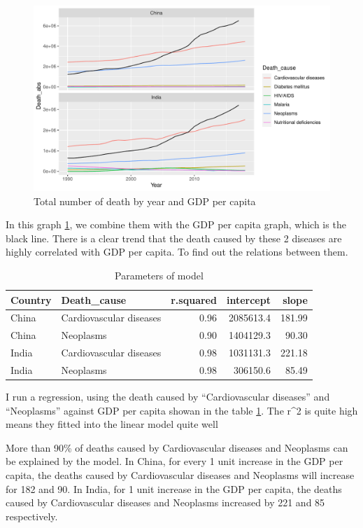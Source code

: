 \documentclass[11pt,a4paper,]{article}
\begin{document}
\begin{figure}
\centering
\includegraphics{Assignment4_files/figure-latex/totaldeath-1.pdf}
\caption{\label{fig:totaldeath}Total number of death by year and GDP per capita}
\end{figure}

In this graph \ref{fig:totaldeath}, we combine them with the GDP per capita graph, which is the black line. There is a clear trend that the death caused by these 2 diseases are highly correlated with GDP per capita. To find out the relations between them.

\begin{table}

\caption{\label{tab:modelparameter}Parameters of model}
\centering
\begin{tabular}[t]{l|l|r|r|r}
\hline
Country & Death\_cause & r.squared & intercept & slope\\
\hline
China & Cardiovascular diseases & 0.96 & 2085613.4 & 181.99\\
\hline
China & Neoplasms & 0.90 & 1404129.3 & 90.30\\
\hline
India & Cardiovascular diseases & 0.98 & 1031131.3 & 221.18\\
\hline
India & Neoplasms & 0.98 & 306150.6 & 85.49\\
\hline
\end{tabular}
\end{table}

I run a regression, using the death caused by ``Cardiovascular diseases'' and ``Neoplasms'' against GDP per capita showan in the table \ref{tab:modelparameter}. The r\^{}2 is quite high means they fitted into the linear model quite well

More than 90\% of deaths caused by Cardiovascular diseases and Neoplasms can be explained by the model. In China, for every 1 unit increase in the GDP per capita, the deaths caused by Cardiovascular diseases and Neoplasms will increase for 182 and 90. In India, for 1 unit increase in the GDP per capita, the deaths caused by Cardiovascular diseases and Neoplasms increased by 221 and 85 respectively.
\end{document}
